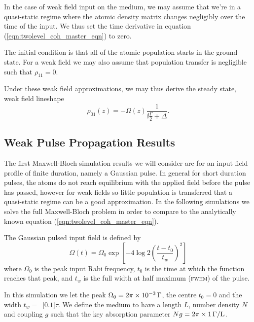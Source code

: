     In the case of weak field input on the medium, we may assume that we're in a
    quasi-static regime where the atomic density matrix changes negligibly over
    the time of the input. We thus set the time derivative in equation
    (\ref{eqn:twolevel_coh_master_eqn}) to zero.

    The initial condition is that all of the atomic population starts in the
    ground state. For a weak field we may also assume that population transfer
    is negligible such that $\rho_{11} = 0$.

    Under these weak field approximations, we may thus derive the steady state,
    weak field lineshape
    \begin{equation}\label{eqn:weak_lineshape}
      \rho_{01}(z) = -\Omega(z) \frac{1}{\ii \frac{\Gamma}{2} + \Delta}.
    \end{equation}

  \subsection{Weak Pulse Propagation Results}    

    The first Maxwell-Bloch simulation results we will consider are for an input
    field profile of finite duration, namely a Gaussian pulse. In general for
    short duration pulses, the atoms do not reach equilibrium with the applied
    field before the pulse has passed, however for weak fields so little
    population is transferred that a quasi-static regime can be a good
    approximation. In the following simulations we solve the full Maxwell-Bloch
    problem in order to compare to the analytically known equation
    (\ref{eqn:twolevel_coh_master_eqn}).

    The Gaussian pulsed input field is defined by
    \begin{equation}
      \Omega(t) = \Omega_{0} \exp \left[ -4 \log 2 \left( \frac{t - t_0}{t_w}
                              \right)^2 \right]
      \label{eqn:gaussian}
    \end{equation}
    where $\Omega_{0}$ is the peak input Rabi frequency, $t_0$ is the time at
    which the function reaches that peak, and $t_w$ is the full width at half
    maximum (\textsc{fwhm}) of the pulse.

    In this simulation we let the peak $\Omega_0 =
    \unit[2\pi\times10^{-3}]{\Gamma}$, the centre $t_0 = 0$ and the width $t_w
    =$~\unit[$0.1$]{$\tau$}. We define the medium to have a length $L$, number
    density $N$ and coupling $g$ such that the key absorption parameter $Ng =
    \unit[2\pi\times1]{\Gamma /L}$.

